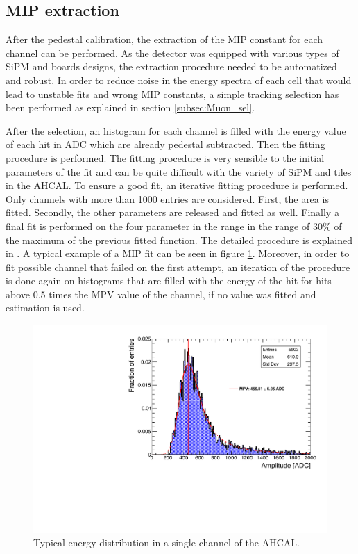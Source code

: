 \subsection{MIP extraction}

After the pedestal calibration, the extraction of the MIP constant for each channel can be performed. As the detector was equipped with various types of SiPM and boards designs, the extraction procedure needed to be automatized and robust. In order to reduce noise in the energy spectra of each cell that would lead to unstable fits and wrong MIP constants, a simple tracking selection has been performed as explained in section \ref{subsec:Muon_sel}.

After the selection, an histogram for each channel is filled with the energy value of each hit in ADC which are already pedestal subtracted. Then the fitting procedure is performed. The fitting procedure is very sensible to the initial parameters of the fit and can be quite difficult with the variety of SiPM and tiles in the AHCAL. To ensure a good fit, an iterative fitting procedure is performed. Only channels with more than 1000 entries are considered. First, the area is fitted. Secondly, the other parameters are released and fitted as well. Finally a final fit is performed on the four parameter in the range in the range of 30\% of the maximum of the previous fitted function. The detailed procedure is explained in \cite{FabianThesis}. A typical example of a MIP fit can be seen in figure \ref{fig:MIPFit}. Moreover, in order to fit possible channel that failed on the first attempt, an iteration of the procedure is done again on histograms that are filled with the energy of the hit for hits above 0.5 times the MPV value of the channel, if no value was fitted and estimation is used.

\begin{figure}[htbp!]
	\centering
	\includegraphics[width=0.7\linewidth]{chap5/fig_EnergyCalib/ExampleMIP_Module3.pdf}
	\caption{Typical energy distribution in a single channel of the AHCAL.} \label{fig:MIPFit}
\end{figure}


